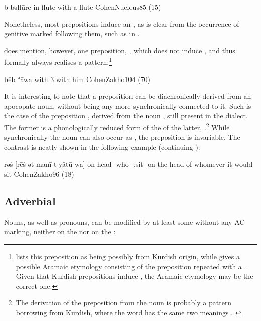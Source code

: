 {b\cb{} bəllūre}
{in\cb{} flute}
{with a flute}
{CohenNucleus}{85 (15)}


 Nonetheless, most prepositions induce an , as is clear from the occurrence of genitive marked \secns following them, such as in  .

\citet[104]{CohenZakho} does mention, however, one preposition, , which does not induce , and thus formally always realises a  pattern:\footnote{\citet[108]{SabarDictionary} lists this preposition as being possibly from Kurdish origin, while \citet[121]{MutzafiBetanure} gives a possible Aramaic etymology  consisting of the preposition  repeated with a . Given that Kurdish \Kur prepositions induce , the Aramaic etymology may be the correct one.}

{bēb ʾāwa}
{with 3\masc}
{with him}
{CohenZakho}{104 (70)}

It is interesting to note that a preposition can be diachronically derived from an apocopate \cst* noun, without being any more synchronically connected to it. Such is the case of the preposition , derived from the noun , still present in the dialect. The former is a phonologically reduced form of the \cst* of the latter, .\footnote{The derivation of the preposition  from the noun  is probably a pattern borrowing from Kurdish, where the word  has the same two meanings \citep[206]{Noorlander}. \label{ft:reš}} While synchronically the noun can also occur as , the preposition is invariable. The contrast is neatly shown in the following example (continuing ):

{rəš [rēš-ət manī-t yātū-wa]}
{on head-\cst{} who-\cst{} \sbjv.sit-\pst}
{on the head of whomever it would sit}
{CohenZakho}{96 (18)}




\subsection{Adverbial \secns}

Nouns, as well as pronouns, can be modified by at least some  \secns without any AC marking, neither on the \prim nor on the \secn:

